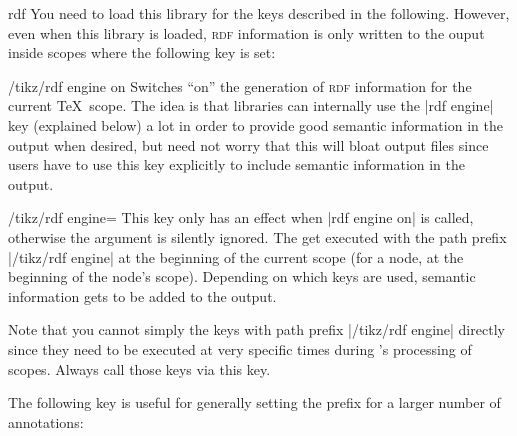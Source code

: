 \begin{tikzlibrary}{rdf}
  You need to load this library for the keys described in the
  following. However, even when this library is loaded, 
  \textsc{rdf} information is only written to the ouput inside scopes
  where the following key is set:
  \begin{key}{/tikz/rdf engine on}
    Switches ``on'' the generation of \textsc{rdf} information for the
    current \TeX\ scope. The
    idea is that libraries can internally use the |rdf engine| key
    (explained below) a lot in order to provide good semantic
    information in the output when desired, but need not worry that
    this will bloat output files since users have to use this key
    explicitly to include semantic information in the output.
  \end{key}
\end{tikzlibrary}


\begin{key}{/tikz/rdf engine=}
  This key only has an effect when |rdf engine on| is called,
  otherwise the argument is silently ignored. The  get
  executed with the path prefix |/tikz/rdf engine| at the beginning of
  the current scope (for a node, at the beginning of the node's
  scope). Depending on which keys are used, semantic information gets
  to be added to the output.

  Note that you cannot simply the keys with path prefix
  |/tikz/rdf engine| directly since they need to be executed at very
  specific times during \tikzname's processing of scopes. Always call
  those keys via this key.
\end{key}


The following key is useful for generally setting the prefix for a
larger number of annotations:

